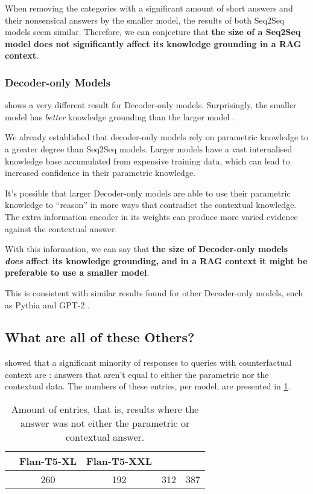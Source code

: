 When removing the categories with a significant amount of short answers and their nonsensical answers by the smaller model, the results of both Seq2Seq models seem similar.
Therefore, we can conjecture that \textbf{the size of a Seq2Seq model does not significantly affect its knowledge grounding in a RAG context}.

\subsubsection{Decoder-only Models}

 shows a very different result for Decoder-only models.
Surprisingly, the smaller model \smallllama{} has \textit{better} knowledge grounding than the larger model \bigllama{}.

We already established that decoder-only models rely on parametric knowledge to a greater degree than Seq2Seq models.
Larger models have a vast internalised knowledge base accumulated from expensive training data, which can lead to increased confidence in their parametric knowledge.

It's possible that larger Decoder-only models are able to use their parametric knowledge to ``reason'' in more ways that contradict the contextual knowledge.
The extra information encoder in its weights can produce more varied evidence against the contextual answer.

With this information, we can say that \textbf{the size of Decoder-only models \textit{does} affect its knowledge grounding, and in a RAG context it might be preferable to use a smaller model}.

This is consistent with similar results found for other Decoder-only models, such as Pythia and GPT-2 \citep{factual_recall}.

\newpage{}
\subsection{What are all of these Others?}

 showed that a significant minority of responses to queries with counterfactual context are \Other{}: answers that aren't equal to either the parametric nor the contextual data.
The numbers of these entries, per model, are presented in \cref{others_list}.

\begin{table}[h]
	\centering
	\footnotesize
	\begin{tabular}{>{\bfseries}l | c c c c}
		\toprule
			& \ttfamily\scriptsize Flan-T5-XL & \ttfamily\scriptsize Flan-T5-XXL & \ttfamily\scriptsize \llamaparbox{} & \ttfamily\scriptsize \bigllamaparbox{} \\
		\midrule
			\Other{} & 260 & 192 & 312 & 387 \\
		\bottomrule
	\end{tabular}
	\caption{Amount of \Other{} entries, that is, results where the answer was not either the parametric or contextual answer.}
	\label{others_list}
\end{table}

